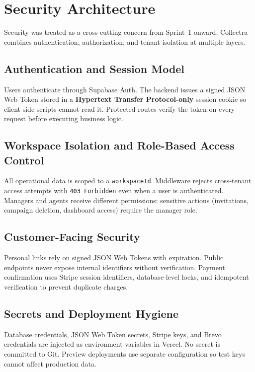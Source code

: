 ﻿\documentclass[12pt,a4paper]{report}
\begin{document}
\section{Security Architecture}
\label{sec:security}

Security was treated as a cross-cutting concern from Sprint~1 onward.
Collectra combines authentication, authorization, and tenant isolation at multiple layers.

\subsection{Authentication and Session Model}

Users authenticate through Supabase Auth.
The backend issues a signed JSON Web Token stored in a \textbf{Hypertext Transfer Protocol-only}
session cookie so client-side scripts cannot read it.
Protected routes verify the token on every request before executing business logic.

\subsection{Workspace Isolation and Role-Based Access Control}

All operational data is scoped to a \texttt{workspaceId}.
Middleware rejects cross-tenant access attempts with \texttt{403 Forbidden} even when a user
is authenticated.
Managers and agents receive different permissions: sensitive actions (invitations, campaign
deletion, dashboard access) require the manager role.

\subsection{Customer-Facing Security}

Personal links rely on signed JSON Web Tokens with expiration.
Public endpoints never expose internal identifiers without verification.
Payment confirmation uses Stripe session identifiers, database-level locks, and idempotent
verification to prevent duplicate charges.

\subsection{Secrets and Deployment Hygiene}

Database credentials, JSON Web Token secrets, Stripe keys, and Brevo credentials are injected
as environment variables in Vercel.
No secret is committed to Git.
Preview deployments use separate configuration so test keys cannot affect production data.
\end{document}
